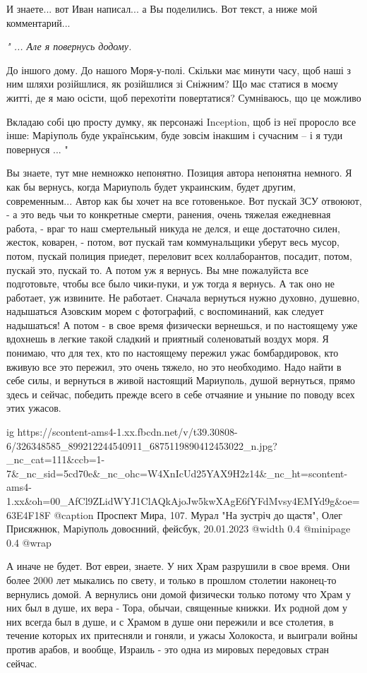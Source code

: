 И знаете... вот Иван написал... а Вы поделились. Вот текст, а ниже мой комментарий...

\begingroup
\em
"
...
Але я повернусь додому.

До іншого дому. До нашого Моря-у-полі. Скільки має минути часу, щоб наші з ним
шляхи розійшлися, як розійшлися зі Сніжним? Що має статися в моєму житті, де я
маю осісти, щоб перехотіти повертатися? Сумніваюсь, що це можливо

Вкладаю собі цю просту думку, як персонажі Inception, щоб із неї проросло все
інше: Маріуполь буде українським, буде зовсім інакшим і сучасним – і я туди
повернуся
...
"
\endgroup

Вы знаете, тут мне немножко непонятно. Позиция автора непонятна немного. Я как
бы вернусь, когда Мариуполь будет украинским, будет другим, современным...
Автор как бы хочет на все готовенькое. Вот пускай ЗСУ отвоюют, - а это ведь чьи
то конкретные смерти, ранения, очень тяжелая ежедневная работа, - враг то наш
смертельный никуда не делся, и еще достаточно силен, жесток, коварен, - потом,
вот пускай там коммунальщики уберут весь мусор, потом, пускай полиция приедет,
переловит всех коллаборантов, посадит, потом, пускай это, пускай то. А потом уж
я вернусь. Вы мне пожалуйста все подготовьте, чтобы все было чики-пуки, и уж
тогда я вернусь. А так оно не работает, уж извините. Не работает. Сначала
вернуться нужно духовно, душевно, надышаться Азовским морем с фотографий, с
воспоминаний, как следует надышаться!  А потом - в свое время физически
вернешься, и по настоящему уже вдохнешь в легкие такой сладкий и приятный
соленоватый воздух моря. Я понимаю, что для тех, кто по настоящему пережил ужас
бомбардировок, кто вживую все это пережил, это очень тяжело, но это необходимо.
Надо найти в себе силы, и вернуться в живой настоящий Мариуполь, душой
вернуться, прямо здесь и сейчас, победить прежде всего в себе отчаяние и уныние
по поводу всех этих ужасов.

\ifcmt
  ig https://scontent-ams4-1.xx.fbcdn.net/v/t39.30808-6/326348585_899212244540911_6875119890412453022_n.jpg?_nc_cat=111&ccb=1-7&_nc_sid=5cd70e&_nc_ohc=W4XnIcUd25YAX9H2z14&_nc_ht=scontent-ams4-1.xx&oh=00_AfCl9ZLidWYJ1ClAQkAjoJw5kwXAgE6fYFdMvsy4EMYd9g&oe=63E4F18F
	@caption Проспект Мира, 107. Мурал "На зустріч до щастя", Олег Присяжнюк, Марiуполь довоєнний, фейсбук, 20.01.2023
  @width 0.4
  @minipage 0.4
  @wrap \parpic[r]
\fi

А иначе не будет. Вот евреи, знаете. У них
Храм разрушили в свое время. Они более 2000 лет мыкались по свету, и только в
прошлом столетии наконец-то вернулись домой. А вернулись они домой физически
только потому что Храм у них был в душе, их вера - Тора, обычаи, священные
книжки. Их родной дом у них всегда был в душе, и с Храмом в душе они пережили и
все столетия, в течение которых их притесняли и гоняли, и ужасы Холокоста, и
выиграли войны против арабов, и вообще, Израиль - это одна из мировых передовых
стран сейчас.

